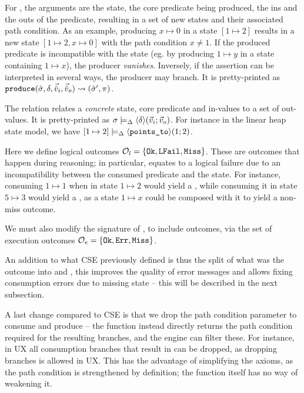 For \produce{}, the arguments are the state, the core predicate being produced, the ins and the outs of the predicate, resulting in a set of new states and their associated path condition. As an example, producing $x \mapsto 0$ in a state $[1 \mapsto 2]$ results in a new state $[1\mapsto 2, x \mapsto 0]$ with the path condition $x \neq 1$. If the produced predicate is incompatible with the state (eg. by producing $1 \mapsto y$ in a state containing $1 \mapsto x$), the producer \emph{vanishes}. Inversely, if the assertion can be interpreted in several ways, the producer may branch. It is pretty-printed as $\texttt{produce}(\hat{\sigma},\delta,\vec{\hat{v}}_i,\vec{\hat{v}}_o)\rightsquigarrow (\hat{\sigma}', \pi)$.

The  relation relates a \emph{concrete} state, core predicate and in-values to a set of out-values. It is pretty-printed as $\sigma \models_\Delta \left<\delta\right>\!(\vec{v}_i;\vec{v}_o)$. For instance in the linear heap state model, we have $[ 1 \mapsto 2 ] \models_\Delta \left<\texttt{points\_to}\right>\!(1;2)$.

Here we define logical outcomes ${\cal O}_l = \{\texttt{Ok}, \texttt{LFail}, \texttt{Miss} \}$. These are outcomes that happen during reasoning; in particular, \LFail{} equates to a logical failure due to an incompatibility between the consumed predicate and the state. For instance, consuming $1 \mapsto 1$ when in state $1 \mapsto 2$ would yield a \LFail{}, while consuming it in state $5 \mapsto 3$ would yield a \Miss{}, as a state $1\mapsto x$ could be composed with it to yield a non-miss outcome.

We must also modify the signature of \execac, to include \Miss{} outcomes, via the set of execution outcomes ${\cal O}_e=\{\texttt{Ok},\texttt{Err},\texttt{Miss}\}$.

An addition to what CSE previously defined is thus the split of what was the  outcome into \LFail{} and \Miss{}, this improves the quality of error messages and allows fixing consumption errors due to missing state -- this will be described in the next subsection.

A last change compared to CSE is that we drop the path condition parameter to consume and produce -- the function instead directly returns the path condition required for the resulting branches, and the engine can filter these. For instance, in UX all consumption branches that result in \LFail{} can be dropped, as dropping branches is allowed in UX. This has the advantage of simplifying the axioms, as the path condition is strengthened by definition; the function itself has no way of weakening it. 

